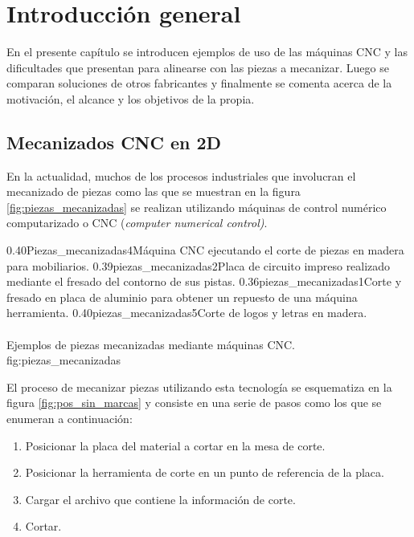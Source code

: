 \chapter{Introducción general} %

En el presente capítulo se introducen ejemplos de uso de las máquinas CNC y las dificultades que presentan para alinearse con las piezas a mecanizar. Luego se comparan soluciones de otros fabricantes y finalmente se comenta acerca de la motivación, el alcance y los objetivos de la propia.

\label{Chapter1} %
\label{IntroGeneral}

\section{Mecanizados CNC en 2D}

En la actualidad, muchos de los procesos industriales que involucran el mecanizado de piezas como las que se muestran en la figura \ref{fig:piezas_mecanizadas} se realizan utilizando máquinas de control numérico computarizado o CNC \citep{WEBSITE:cncwiki} (\textit{computer numerical control)}.

\subfigtwotwo 
         {0.40}{Piezas_mecanizadas4}{Máquina CNC ejecutando el corte de piezas en madera para mobiliarios.} 
         {0.39}{piezas_mecanizadas2}{Placa de circuito impreso realizado mediante el fresado del contorno de sus pistas.}
         {0.36}{piezas_mecanizadas1}{Corte y fresado en placa de aluminio para obtener un repuesto de una máquina herramienta.}
         {0.40}{piezas_mecanizadas5}{Corte de logos y letras en madera. \\ \vphantom{10}\\ \vphantom{10}}
         {Ejemplos de piezas mecanizadas mediante máquinas CNC.}
         {fig:piezas_mecanizadas}

         El proceso de mecanizar piezas utilizando esta tecnología se esquematiza en la figura \ref{fig:pos_sin_marcas} y consiste en una serie de pasos como los que se enumeran a continuación:

\begin{enumerate}
   \item{Posicionar la placa del material a cortar en la mesa de corte.}
   \item{Posicionar la herramienta de corte en un punto de referencia de la placa.}
   \item{Cargar el archivo que contiene la información de corte.}
   \item{Cortar.}
\end{enumerate}

